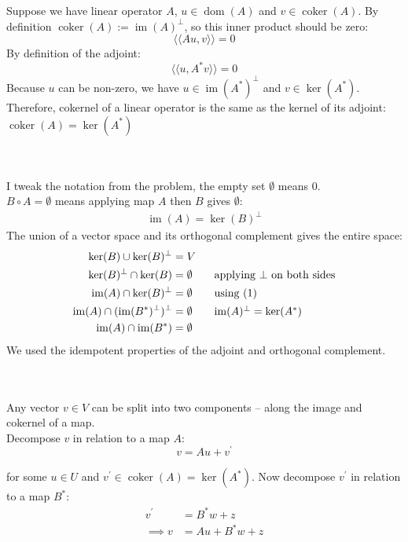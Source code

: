 \documentclass{article}
\def\ll{\langle\langle}
\def\rr{\rangle\rangle}
\DeclareMathOperator{\id}{id}
\DeclareMathOperator{\dom}{dom}
\DeclareMathOperator{\img}{im}
\DeclareMathOperator{\coker}{coker}
\begin{document}
\vspace{1.8cm}
\\\\


Suppose we have linear operator $A$, $u \in \dom(A)$ and $v \in \coker(A)$. By definition $\coker(A) := \img(A)^\perp$,
so this inner product should be zero:
$$\ll Au, v \rr = 0$$
By definition of the adjoint:
$$\ll u, A^*v \rr = 0$$
Because $u$ can be non-zero, we have $u \in \img(A^*)^\perp$ and $v \in \ker(A^*)$.\\
Therefore, cokernel of a linear operator is the same as the kernel of its adjoint: $\coker(A) = \ker(A^*)$


\pagebreak
{}\\\\


I tweak the notation from the problem, the empty set $\emptyset$ means 0.\\
$B \circ A = \emptyset$ means applying map $A$ then $B$ gives $\emptyset$:
\begin{align}
    \img(A) = \ker(B)^\perp
\end{align}
The union of a vector space and its orthogonal complement gives the entire space:
\begin{align*}
    \ker(B) \cup \ker(B)^\perp &= V \\
    \ker(B)^\perp \cap \ker(B) &= \emptyset \tag*{applying $\perp$ on both sides} \\
    \img(A) \cap \ker(B)^\perp &= \emptyset \tag*{using (1)} \\
    \img(A) \cap (\img(B^*)^\perp)^\perp &= \emptyset \tag*{$\img(A)^\perp = \ker(A^*)$} \\
    \img(A) \cap \img(B^*) &= \emptyset \\
\end{align*}
We used the idempotent properties of the adjoint and orthogonal complement.%


\vspace{1.8cm}
\\\\


Any vector $v \in V$ can be split into two components -- along the image and cokernel of a map.\\

Decompose $v$ in relation to a map $A$:
$$
    v = Au + v^\prime
$$

for some $u \in U$ and $v^\prime \in \coker(A) = \ker(A^*)$. Now decompose $v^\prime$ in relation to a map $B^*$:
\begin{align*}
    v^\prime &= B^*w + z \\
    \implies v &= Au + B^*w + z
\end{align*}
\end{document}
